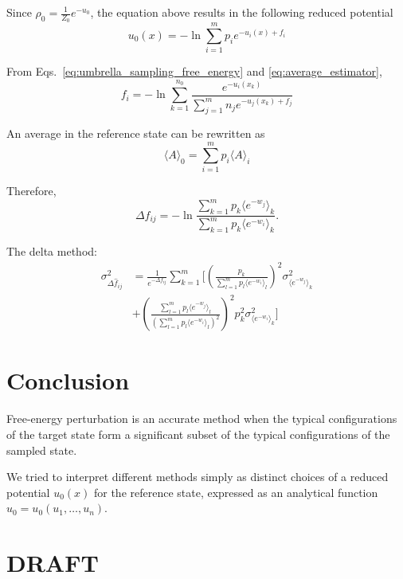 \documentclass[aip,jcp,reprint,amsmath,amssymb]{revtex4-1}
\begin{document}
Since $\rho_0 = \frac{1}{Z_0} e^{-u_0}$, the equation above results in the following reduced potential
\begin{equation}
\label{eq:mbar_reduced_potential}
u_0(x) = -\ln \sum_{i=1}^m p_i e^{-u_i(x) + f_i}
\end{equation}

From Eqs.~\eqref{eq:umbrella_sampling_free_energy} and \eqref{eq:average_estimator},
\begin{equation*}
f_i = -\ln \sum_{k=1}^{n_0} \frac{e^{-u_i(x_k)}}{\sum_{j=1}^m n_j e^{-u_j(x_k) + f_j}}
\end{equation*}

An average in the reference state can be rewritten as
\begin{equation}
\label{eq:average_reference_state}
\langle A \rangle_0 = \sum_{i=1}^m p_i \langle A \rangle_i
\end{equation}

Therefore,
\begin{equation*}
\label{eq:mbar_free_energy_difference}
\Delta f_{ij} = - \ln \frac{\sum_{k=1}^m p_k \langle e^{-w_j} \rangle_k}{\sum_{k=1}^m p_k \langle e^{-w_i} \rangle_k}.
\end{equation*}

The delta method:
\begin{align*}
\sigma^2_{\Delta \hat f_{ij}} &= \frac{1}{e^{-\Delta f_{ij}}} \sum_{k=1}^m \Bigg[ \left(\frac{p_k}{\sum_{l=1}^m p_l \langle e^{-w_i} \rangle_l } \right)^2 \sigma^2_{\langle e^{-w_j} \rangle_k} \\
&+ \left( \frac{\sum_{l=1}^m p_l \langle e^{-w_j} \rangle_l}{(\sum_{l=1}^m p_l \langle e^{-w_i} \rangle_l)^2}\right)^2 p_k^2 \sigma^2_{\langle e^{-w_i} \rangle_k} \Bigg]
\end{align*}

\section{Conclusion}

Free-energy perturbation is an accurate method when the typical configurations of the target state form a significant subset of the typical configurations of the sampled state.

We tried to interpret different methods simply as distinct choices of a reduced potential $u_0(x)$ for the reference state, expressed as an analytical function $u_0 = u_0(u_1,\dots,u_n)$.

\section{DRAFT}
\end{document}
